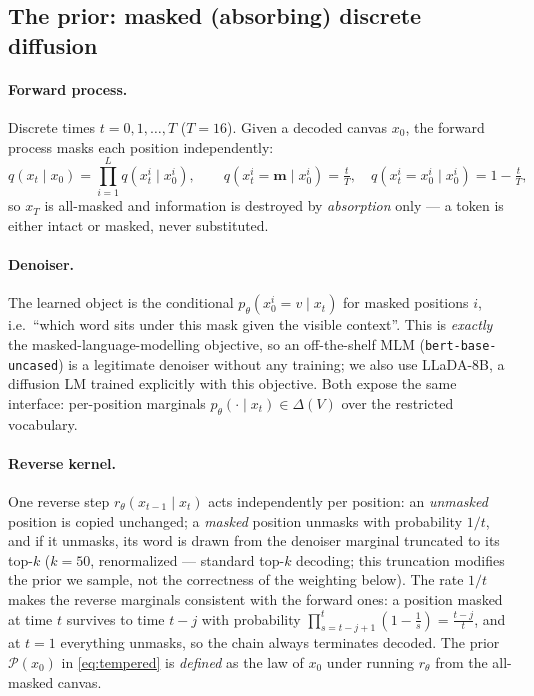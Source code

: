 \documentclass[11pt]{article}
\newcommand{\Pd}{\mathcal{P}}
\newcommand{\mask}{\mathbf{m}}
\begin{document}
\subsection{The prior: masked (absorbing) discrete diffusion}
\label{sec:prior}
\paragraph{Forward process.} Discrete times $t = 0, 1, \dots, T$
($T{=}16$). Given a decoded canvas $x_0$, the forward process masks each
position independently:
\begin{equation}
q(x_t \mid x_0) = \prod_{i=1}^{L} q(x_t^i \mid x_0^i),
\qquad
q(x_t^i = \mask \mid x_0^i) = \tfrac{t}{T},
\quad
q(x_t^i = x_0^i \mid x_0^i) = 1 - \tfrac{t}{T},
\end{equation}
so $x_T$ is all-masked and information is destroyed by \emph{absorption}
only --- a token is either intact or masked, never substituted.

\paragraph{Denoiser.} The learned object is the conditional
$p_\theta(x_0^i = v \mid x_t)$ for masked positions $i$, i.e.\ ``which word
sits under this mask given the visible context''. This is \emph{exactly}
the masked-language-modelling objective, so an off-the-shelf MLM
(\texttt{bert-base-uncased}) is a legitimate denoiser without any training;
we also use LLaDA-8B, a diffusion LM trained explicitly with this
objective. Both expose the same interface: per-position marginals
$p_\theta(\cdot \mid x_t) \in \Delta(V)$ over the restricted vocabulary.

\paragraph{Reverse kernel.} One reverse step $r_\theta(x_{t-1} \mid x_t)$
acts independently per position: an \emph{unmasked} position is copied
unchanged; a \emph{masked} position unmasks with probability $1/t$, and if
it unmasks, its word is drawn from the denoiser marginal truncated to its
top-$k$ ($k{=}50$, renormalized --- standard top-$k$ decoding; this
truncation modifies the prior we sample, not the correctness of the
weighting below). The rate $1/t$ makes the reverse marginals consistent
with the forward ones: a position masked at time $t$ survives to time
$t-j$ with probability $\prod_{s=t-j+1}^{t}(1 - \tfrac1s) = \tfrac{t-j}{t}$,
and at $t{=}1$ everything unmasks, so the chain always terminates decoded.
The prior $\Pd(x_0)$ in \eqref{eq:tempered} is \emph{defined} as the law of
$x_0$ under running $r_\theta$ from the all-masked canvas.
\end{document}

